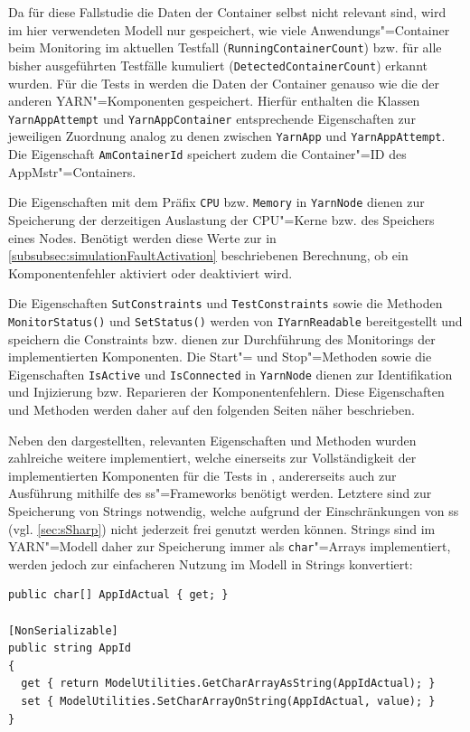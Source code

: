 Da für diese Fallstudie die Daten der Container selbst nicht relevant sind, wird im hier verwendeten Modell nur gespeichert, wie viele Anwendungs"=Container beim Monitoring im aktuellen Testfall (\texttt{RunningContainerCount}) bzw. für alle bisher ausgeführten Testfälle kumuliert (\texttt{DetectedContainerCount}) erkannt wurden.
Für die Tests in \cite{Eberhardinger2018} werden die Daten der Container genauso wie die der anderen \ac{YARN}"=Komponenten gespeichert.
Hierfür enthalten die Klassen \texttt{YarnAppAttempt} und \texttt{YarnAppContainer} entsprechende Eigenschaften zur jeweiligen Zuordnung analog zu denen zwischen \texttt{YarnApp} und \texttt{YarnAppAttempt}.
Die Eigenschaft \texttt{AmContainerId} speichert zudem die Container"=ID des \ac{AppMstr}"=Containers.

Die Eigenschaften mit dem Präfix \texttt{CPU} bzw. \texttt{Memory} in \texttt{YarnNode} dienen zur Speicherung der derzeitigen Auslastung der CPU"=Kerne bzw. des Speichers eines Nodes.
Benötigt werden diese Werte zur in \cref{subsubsec:simulationFaultActivation} beschriebenen Berechnung, ob ein Komponentenfehler aktiviert oder deaktiviert wird.

Die Eigenschaften \texttt{SutConstraints} und \texttt{TestConstraints} sowie die Methoden \texttt{MonitorStatus()} und \texttt{SetStatus()} werden von \texttt{IYarnReadable} bereitgestellt und speichern die Constraints bzw. dienen zur Durchführung des Monitorings der implementierten Komponenten.
Die Start"= und Stop"=Methoden sowie die Eigenschaften \texttt{IsActive} und \texttt{IsConnected} in \texttt{YarnNode} dienen zur Identifikation und Injizierung bzw. Reparieren der Komponentenfehlern.
Diese Eigenschaften und Methoden werden daher auf den folgenden Seiten näher beschrieben.

Neben den dargestellten, relevanten Eigenschaften und Methoden wurden zahlreiche weitere implementiert, welche einerseits zur Vollständigkeit der implementierten Komponenten für die Tests in \cite{Eberhardinger2018}, andererseits auch zur Ausführung mithilfe des \ac{ss}"=Frameworks benötigt werden.
Letztere sind \zB zur Speicherung von Strings notwendig, welche aufgrund der Einschränkungen von \ac{ss} (vgl. \cref{sec:sSharp}) nicht jederzeit frei genutzt werden können.
Strings sind im \ac{YARN}"=Modell daher zur Speicherung immer als  \texttt{char}"=Arrays implementiert, werden jedoch zur einfacheren Nutzung im Modell in Strings konvertiert:

\begin{lstlisting}[label=lst:modelCharArrayAsString,style=cs,
caption={[Implementierung der Eigenschaft AppId]
    Implementierung der Eigenschaft \texttt{AppId}.
    Die beiden Methoden \texttt{GetCharArrayAsString} und \texttt{SetCharArrayOnString} führen die Konvertierung in den \texttt{char}"=Array bzw. des \texttt{char}"=Arrays in einen String durch.}]
public char[] AppIdActual { get; }

[NonSerializable]
public string AppId
{
  get { return ModelUtilities.GetCharArrayAsString(AppIdActual); }
  set { ModelUtilities.SetCharArrayOnString(AppIdActual, value); }
}
\end{lstlisting}

